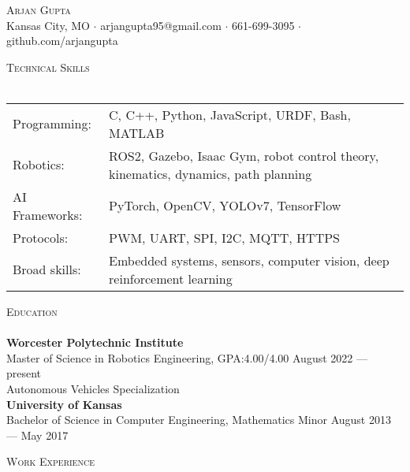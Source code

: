 \documentclass[a4paper]{article}
\newcommand{\lineunder} {
    \vspace*{-8pt} \\
    \hspace*{-18pt} \hrulefill \\
}
\newcommand{\header} [1] {
    {\hspace*{-18pt}\vspace*{6pt} \textsc{#1}}
    \vspace*{-6pt} \lineunder
}
\begin{document}
\vspace*{-40pt}

    

\vspace*{-10pt}
\begin{center}
	{\Huge \scshape {Arjan Gupta}}\\
	Kansas City, MO $\cdot$ arjangupta95@gmail.com $\cdot$ 661-699-3095 $\cdot$ github.com/arjangupta\\
\end{center}

\header{Technical Skills}
\vspace{2mm}
\begin{tabular}{ l l }
	Programming: & C, C++, Python, JavaScript, URDF, Bash, MATLAB \\
    Robotics: & ROS2, Gazebo, Isaac Gym, robot control theory, kinematics, dynamics, path planning \\
    AI Frameworks: & PyTorch, OpenCV, YOLOv7, TensorFlow \\
    Protocols:             & PWM, UART, SPI, I2C, MQTT,  HTTPS \\
    Broad skills: & Embedded systems, sensors, computer vision, deep reinforcement learning
\end{tabular}
\vspace{2mm}

\header{Education}
\textbf{Worcester Polytechnic Institute}\\
Master of Science in Robotics Engineering, GPA:\@ 4.00/4.00 \hfill August 2022 --- present\\
Autonomous Vehicles Specialization\\
\vspace{2mm}
\textbf{University of Kansas}\\
Bachelor of Science in Computer Engineering, Mathematics Minor \hfill August 2013 --- May 2017\\

\vspace{3mm}

\header{Work Experience}
\vspace{1mm}
\end{document}
